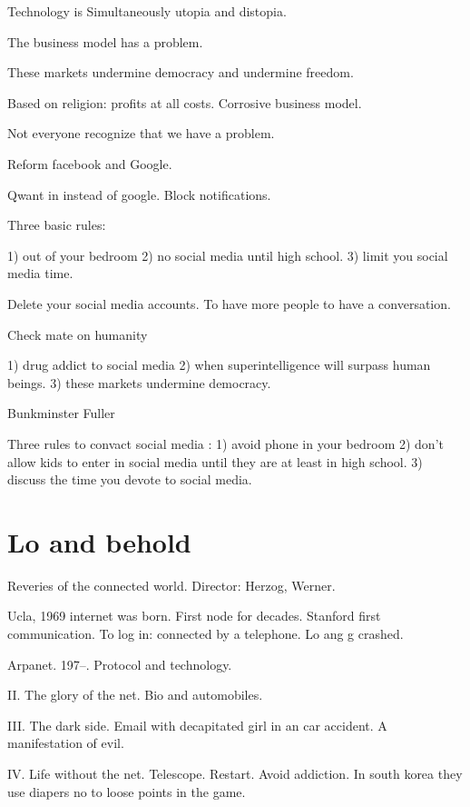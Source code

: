  
 Technology is Simultaneously utopia and distopia. 
 
 The business model has a problem. 
 
 These markets undermine democracy and undermine freedom. 
 
 Based on religion: profits at all costs. Corrosive business model.  
 
 Not everyone recognize that we have a problem. 
 
 Reform facebook and Google. 
 
 Qwant in instead of google. Block notifications. 
 
 
 Three basic rules:
 
 1) out of your bedroom
 2) no social media until high school. 
 3) limit you social media time. 
 
 
 Delete your social media accounts. To have more people to have a conversation. 
 
 
 Check mate on humanity 
 
 1) drug addict to social media 
 2) when superintelligence will surpass human beings. 
 3) these markets undermine democracy. 
 
 Bunkminster Fuller 
 
 
 Three rules to convact social media :
 1) avoid phone in your bedroom
 2) don't allow kids to enter in social media until they are at least in high school. 
 3) discuss the time you devote to social media. 
 
 
 
 
  \section{Lo and behold} 
  Reveries of the connected world.  
  Director: Herzog, Werner. 
  
  
  
  Ucla, 1969 internet was born. 
  First node for decades. 
  Stanford first communication. 
  To log in: connected by a telephone. Lo ang g crashed. 
  
  Arpanet. 197--. Protocol and technology. 
  
  II. The glory of the net. Bio and automobiles. 
  
  III. The dark side. 
  Email with decapitated girl in an car accident. 
  A manifestation of evil. 
  
  IV. Life without the net.  Telescope. 
   Restart. Avoid addiction. 
  In south korea they use diapers no to loose points in the game. 
  
